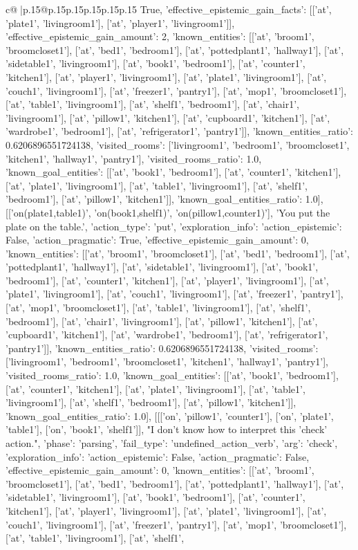 \documentclass{article}
\begin{document}
{\begin{supertabular}{c@{$\;$}|p{.15\linewidth}@{}p{.15\linewidth}p{.15\linewidth}p{.15\linewidth}p{.15\linewidth}p{.15\linewidth}}
{{{True, 'effective_epistemic_gain_facts': [['at', 'plate1', 'livingroom1'], ['at', 'player1', 'livingroom1']], 'effective_epistemic_gain_amount': 2, 'known_entities': [['at', 'broom1', 'broomcloset1'], ['at', 'bed1', 'bedroom1'], ['at', 'pottedplant1', 'hallway1'], ['at', 'sidetable1', 'livingroom1'], ['at', 'book1', 'bedroom1'], ['at', 'counter1', 'kitchen1'], ['at', 'player1', 'livingroom1'], ['at', 'plate1', 'livingroom1'], ['at', 'couch1', 'livingroom1'], ['at', 'freezer1', 'pantry1'], ['at', 'mop1', 'broomcloset1'], ['at', 'table1', 'livingroom1'], ['at', 'shelf1', 'bedroom1'], ['at', 'chair1', 'livingroom1'], ['at', 'pillow1', 'kitchen1'], ['at', 'cupboard1', 'kitchen1'], ['at', 'wardrobe1', 'bedroom1'], ['at', 'refrigerator1', 'pantry1']], 'known_entities_ratio': 0.6206896551724138, 'visited_rooms': ['livingroom1', 'bedroom1', 'broomcloset1', 'kitchen1', 'hallway1', 'pantry1'], 'visited_rooms_ratio': 1.0, 'known_goal_entities': [['at', 'book1', 'bedroom1'], ['at', 'counter1', 'kitchen1'], ['at', 'plate1', 'livingroom1'], ['at', 'table1', 'livingroom1'], ['at', 'shelf1', 'bedroom1'], ['at', 'pillow1', 'kitchen1']], 'known_goal_entities_ratio': 1.0}}], [['on(plate1,table1)', 'on(book1,shelf1)', 'on(pillow1,counter1)'], 'You put the plate on the table.', {'action_type': 'put', 'exploration_info': {'action_epistemic': False, 'action_pragmatic': True, 'effective_epistemic_gain_amount': 0, 'known_entities': [['at', 'broom1', 'broomcloset1'], ['at', 'bed1', 'bedroom1'], ['at', 'pottedplant1', 'hallway1'], ['at', 'sidetable1', 'livingroom1'], ['at', 'book1', 'bedroom1'], ['at', 'counter1', 'kitchen1'], ['at', 'player1', 'livingroom1'], ['at', 'plate1', 'livingroom1'], ['at', 'couch1', 'livingroom1'], ['at', 'freezer1', 'pantry1'], ['at', 'mop1', 'broomcloset1'], ['at', 'table1', 'livingroom1'], ['at', 'shelf1', 'bedroom1'], ['at', 'chair1', 'livingroom1'], ['at', 'pillow1', 'kitchen1'], ['at', 'cupboard1', 'kitchen1'], ['at', 'wardrobe1', 'bedroom1'], ['at', 'refrigerator1', 'pantry1']], 'known_entities_ratio': 0.6206896551724138, 'visited_rooms': ['livingroom1', 'bedroom1', 'broomcloset1', 'kitchen1', 'hallway1', 'pantry1'], 'visited_rooms_ratio': 1.0, 'known_goal_entities': [['at', 'book1', 'bedroom1'], ['at', 'counter1', 'kitchen1'], ['at', 'plate1', 'livingroom1'], ['at', 'table1', 'livingroom1'], ['at', 'shelf1', 'bedroom1'], ['at', 'pillow1', 'kitchen1']], 'known_goal_entities_ratio': 1.0}}], [[['on', 'pillow1', 'counter1'], ['on', 'plate1', 'table1'], ['on', 'book1', 'shelf1']], "I don't know how to interpret this 'check' action.", {'phase': 'parsing', 'fail_type': 'undefined_action_verb', 'arg': 'check', 'exploration_info': {'action_epistemic': False, 'action_pragmatic': False, 'effective_epistemic_gain_amount': 0, 'known_entities': [['at', 'broom1', 'broomcloset1'], ['at', 'bed1', 'bedroom1'], ['at', 'pottedplant1', 'hallway1'], ['at', 'sidetable1', 'livingroom1'], ['at', 'book1', 'bedroom1'], ['at', 'counter1', 'kitchen1'], ['at', 'player1', 'livingroom1'], ['at', 'plate1', 'livingroom1'], ['at', 'couch1', 'livingroom1'], ['at', 'freezer1', 'pantry1'], ['at', 'mop1', 'broomcloset1'], ['at', 'table1', 'livingroom1'], ['at', 'shelf1', }}}
\end{supertabular}}
\end{document}

